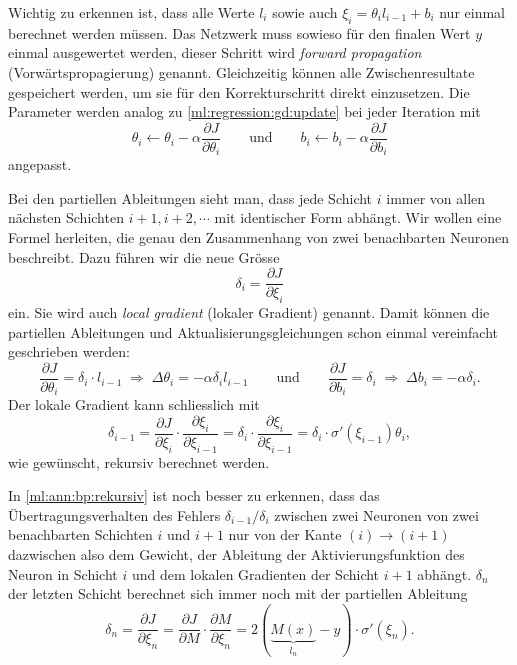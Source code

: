 Wichtig zu erkennen ist, dass alle Werte $l_i$ sowie auch $\xi_i=\theta_i l_{i-1}+b_i$ nur
einmal berechnet werden müssen. Das Netzwerk muss sowieso für den finalen Wert $y$ einmal
ausgewertet werden, dieser Schritt wird \emph{forward propagation} (Vorwärtspropagierung)
genannt. Gleichzeitig können alle Zwischenresultate gespeichert werden, um sie für den
Korrekturschritt direkt einzusetzen.
Die Parameter werden analog zu \eqref{ml:regression:gd:update} bei jeder Iteration mit
\begin{equation}
    \theta_i \leftarrow \theta_i - \alpha \frac{\partial J}{\partial \theta_i}
    \qquad\text{und}\qquad
    b_i \leftarrow b_i - \alpha \frac{\partial J}{\partial b_i}
\end{equation}
angepasst.

Bei den partiellen Ableitungen sieht man, dass jede Schicht $i$ immer von allen
nächsten Schichten $i+1, i+2, \cdots$ mit identischer Form abhängt.
Wir wollen eine Formel herleiten, die genau den Zusammenhang von zwei
benachbarten Neuronen beschreibt. Dazu führen wir die neue Grösse 
\begin{equation}
    \delta_i = \frac{\partial J}{\partial \xi_i}
\end{equation}
ein. Sie wird auch \emph{local gradient} (lokaler Gradient) genannt. Damit können
%
die partiellen Ableitungen und Aktualisierungsgleichungen schon einmal vereinfacht geschrieben werden:
\begin{equation}
    \frac{\partial J}{\partial \theta_i} = \delta_i \cdot l_{i-1}
    \;\Rightarrow\; \Delta \theta_i = - \alpha \delta_i l_{i-1}
    \qquad\text{und}\qquad
    \frac{\partial J}{\partial b_i} = \delta_i
    \; \Rightarrow\; \Delta b_i = - \alpha \delta_i.
\end{equation}
Der lokale Gradient kann schliesslich mit
\begin{equation}
    \delta_{i-1} = \frac{\partial J}{\partial \xi_i} \cdot \frac{\partial \xi_i}{\partial \xi_{i-1}}
    = \delta_i \cdot \frac{\partial \xi_i}{\partial \xi_{i-1}}
    = \delta_i \cdot \sigma'(\xi_{i-1}) \theta_i
    \label{ml:ann:bp:rekursiv},
\end{equation}
wie gewünscht, rekursiv berechnet werden.

In \eqref{ml:ann:bp:rekursiv} ist noch besser zu erkennen, dass das Übertragungsverhalten
des Fehlers $\delta_{i-1}/\delta_i$
zwischen zwei Neuronen von zwei benachbarten Schichten $i$ und $i+1$ nur von der Kante
$(i)\rightarrow(i+1)$ dazwischen also dem
Gewicht, der Ableitung der Aktivierungsfunktion des Neuron in Schicht $i$ und dem lokalen
Gradienten der Schicht $i+1$ abhängt.
$\delta_n$ der letzten Schicht berechnet sich immer noch mit der partiellen Ableitung
\begin{equation}
    \delta_n = \frac{\partial J}{\partial \xi_n}
    = \frac{\partial J}{\partial M} \cdot \frac{\partial M}{\partial \xi_n}
    = 2(\underbrace{M(x)}_{l_n} - y) \cdot \sigma'(\xi_n).
\end{equation}

